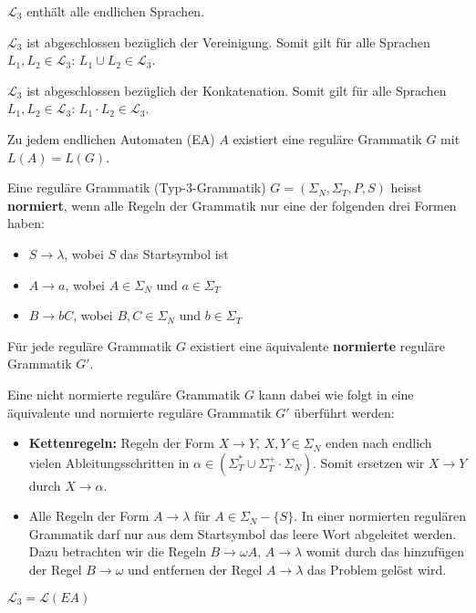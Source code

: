 \begin{lemma}
$\mathcal{L}_3$ enthält alle endlichen Sprachen.\\
\end{lemma}

\begin{lemma}
$\mathcal{L}_3$ ist abgeschlossen bezüglich der Vereinigung. Somit gilt für alle Sprachen $L_1, L_2 \in \mathcal{L}_3: \, L_1 \cup L_2 \in \mathcal{L}_3$.\\
\end{lemma}

\begin{lemma}
$\mathcal{L}_3$ ist abgeschlossen bezüglich der Konkatenation. Somit gilt für alle Sprachen $L_1, L_2 \in \mathcal{L}_3: \, L_1 \cdot L_2 \in \mathcal{L}_3$.\\
\end{lemma}

\begin{satz}
Zu jedem endlichen Automaten (EA) $A$ existiert eine reguläre Grammatik $G$ mit $L(A) = L(G)$.\\
\end{satz}

\begin{definition}
Eine reguläre Grammatik (Typ-3-Grammatik) $G = (\Sigma_N, \Sigma_T, P, S)$ heisst \textbf{normiert}, wenn alle Regeln der Grammatik nur eine der folgenden drei Formen haben:
\begin{itemize}
  \item $S \to \lambda$, wobei $S$ das Startsymbol ist
  \item $A \to a$, wobei $A \in \Sigma_N$ und $a \in \Sigma_T$
  \item $B \to bC$, wobei $B, C \in \Sigma_N$ und $b \in \Sigma_T$\\
\end{itemize}
\end{definition}

\begin{lemma}
Für jede reguläre Grammatik $G$ existiert eine äquivalente \textbf{normierte} reguläre Grammatik $G'$.\\
\end{lemma}

Eine nicht normierte reguläre Grammatik $G$ kann dabei wie folgt in eine äquivalente und normierte reguläre Grammatik $G'$ überführt werden:
\begin{itemize}
  \item \textbf{Kettenregeln:} Regeln der Form $X \to Y, \, X, Y \in \Sigma_N$ enden nach endlich vielen Ableitungsschritten in $\alpha \in (\Sigma_T^* \cup \Sigma_T^+ \cdot \Sigma_N)$. Somit ersetzen wir $X \to Y$ durch $X \to \alpha$.
  \item Alle Regeln der Form $A \to \lambda$ für $A \in \Sigma_N - \{S\}$. In einer normierten regulären Grammatik darf nur aus dem Startsymbol das leere Wort abgeleitet werden. Dazu betrachten wir die Regeln $B \to \omega A, \, A \to \lambda$ womit durch das hinzufügen der Regel $B \to \omega$ und entfernen der Regel $A \to \lambda$ das Problem gelöst wird.\\
\end{itemize}

\begin{satz}
$\mathcal{L}_3 = \mathcal{L}(EA)$
\end{satz}


